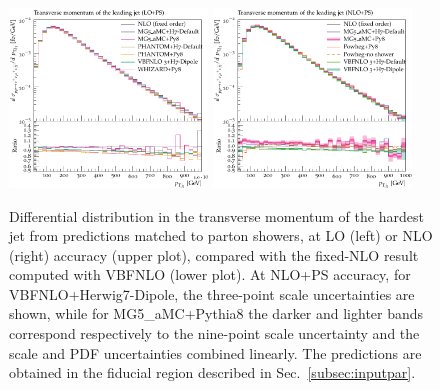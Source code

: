 \documentclass[twocolumn,epjc3]{svjour3} %
\newlength{\width}
\begin{document}
\begin{figure}
\centering
\includegraphics[width=0.47\textwidth]{figures/LOPS/pT_j1.pdf}
\includegraphics[width=0.47\textwidth]{figures/NLOPS/pT_j1.pdf}
\caption{Differential distribution in the
transverse momentum of the hardest jet
from predictions matched to parton showers, at LO (left) or NLO (right) accuracy (upper plot), compared with the fixed-NLO result computed with {\sc VBFNLO} (lower plot). At NLO+PS accuracy, for
    {\sc VBFNLO}+{\sc Herwig7-Dipole}, the three-point scale uncertainties are shown, while for {\sc MG5\_aMC}+{\sc Pythia8} the darker and lighter bands correspond
    respectively to the nine-point scale uncertainty and the scale and PDF uncertainties combined linearly.
    The predictions are obtained in the fiducial region described in Sec.~\protect\ref{subsec:inputpar}.}
\label{fig:PSpt1}
\end{figure}
\end{document}
